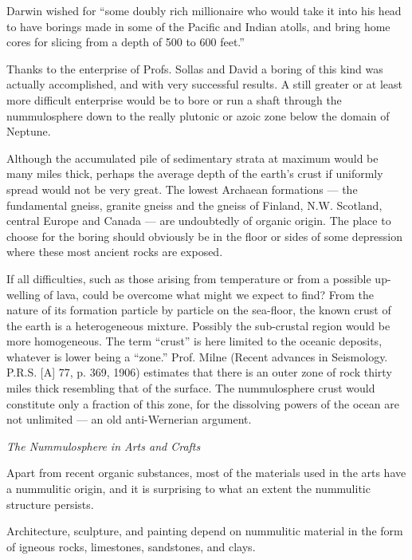 \documentclass[a4paper, 12pt, oneside]{article}
\begin{document}
Darwin wished for ``some doubly rich millionaire who would take it into his head to have borings made in some of the Pacific and Indian atolls, and bring home cores for slicing from a depth of 500 to 600 feet.''

Thanks to the enterprise of Profs. Sollas and David a boring of this kind was actually accomplished, and with very successful results. A still greater or at least more difficult enterprise would be to bore or run a shaft through the nummulosphere down to the really plutonic or azoic zone below the domain of Neptune.

Although the accumulated pile of sedimentary strata at maximum would be many miles thick, perhaps the average depth of the earth's crust if uniformly spread would not be very great. The lowest Archaean formations --- the fundamental gneiss, granite gneiss and the gneiss of Finland, N.W. Scotland, central Europe and Canada --- are undoubtedly of organic origin. The place to choose for the boring should obviously be in the floor or sides of some depression where these most ancient rocks are exposed.

If all difficulties, such as those arising from temperature or from a possible up-welling of lava, could be overcome what might we expect to find? From the nature of its formation particle by particle on the sea-floor, the known crust of the earth is a heterogeneous mixture. Possibly the sub-crustal region would be more homogeneous. The term ``crust'' is here limited to the oceanic deposits, whatever is lower being a ``zone.'' Prof. Milne (Recent advances in Seismology. P.R.S. [A] 77, p. 369, 1906) estimates that there is an outer zone of rock thirty miles thick resembling that of the surface. The nummulosphere crust would constitute only a fraction of this zone, for the dissolving powers of the ocean are not unlimited --- an old anti-Wernerian argument.

\centerline{\emph{The Nummulosphere in Arts and Crafts}}

Apart from recent organic substances, most of the materials used in the arts have a nummulitic origin, and it is surprising to what an extent the nummulitic structure persists.

Architecture, sculpture, and painting depend on nummulitic material in the form of igneous rocks, limestones, sandstones, and clays.
\end{document}
